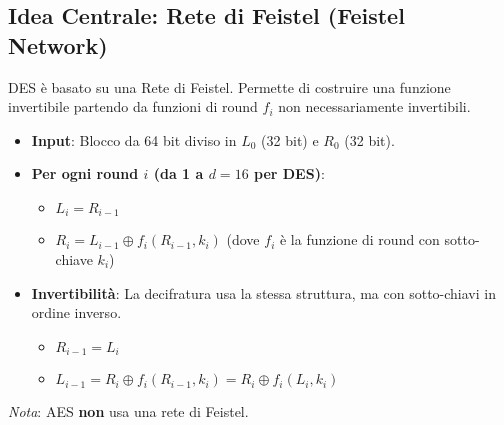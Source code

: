 \documentclass{article}
\begin{document}
\subsection{Idea Centrale: Rete di Feistel (Feistel Network)}
DES è basato su una Rete di Feistel. Permette di costruire una funzione invertibile partendo da funzioni di round $f_i$ non necessariamente invertibili.
\begin{itemize}
    \item \textbf{Input}: Blocco da 64 bit diviso in $L_0$ (32 bit) e $R_0$ (32 bit).
    \item \textbf{Per ogni round $i$ (da 1 a $d=16$ per DES)}:
    \begin{itemize}
        \item $L_i = R_{i-1}$
        \item $R_i = L_{i-1} \oplus f_i(R_{i-1}, k_i)$ (dove $f_i$ è la funzione di round con sotto-chiave $k_i$)
    \end{itemize}
    \item \textbf{Invertibilità}: La decifratura usa la stessa struttura, ma con sotto-chiavi in ordine inverso.
        \begin{itemize}
            \item $R_{i-1} = L_i$
            \item $L_{i-1} = R_i \oplus f_i(R_{i-1}, k_i) = R_i \oplus f_i(L_i, k_i)$
        \end{itemize}
\end{itemize}
\textit{Nota}: AES \textbf{non} usa una rete di Feistel.
\end{document}
